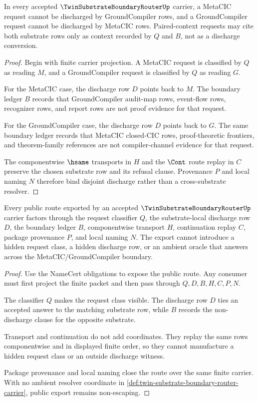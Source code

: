 \begin{theorem}
\label{thm:twin-substrate-boundary-router-metacic-groundcompiler-disjointness}
In every accepted $\TwinSubstrateBoundaryRouterUp$ carrier, a MetaCIC request cannot be discharged by GroundCompiler rows, and a GroundCompiler request cannot be discharged by MetaCIC rows. Paired-context requests may cite both substrate rows only as context recorded by $Q$ and $B$, not as a discharge conversion.
\end{theorem}
\begin{proof}
Begin with finite carrier projection. A MetaCIC request is classified by $Q$ as reading $M$, and a GroundCompiler request is classified by $Q$ as reading $G$.

For the MetaCIC case, the discharge row $D$ points back to $M$. The boundary ledger $B$ records that GroundCompiler audit-map rows, event-flow rows, recognizer rows, and report rows are not proof evidence for that request.

For the GroundCompiler case, the discharge row $D$ points back to $G$. The same boundary ledger records that MetaCIC closed-CIC rows, proof-theoretic frontiers, and theorem-family references are not compiler-channel evidence for that request.

The componentwise $\hsame$ transports in $H$ and the $\Cont$ route replay in $C$ preserve the chosen substrate row and its refusal clause. Provenance $P$ and local naming $N$ therefore bind disjoint discharge rather than a cross-substrate resolver.
\end{proof}

\begin{theorem}
\label{thm:twin-substrate-boundary-router-nonescape}
Every public route exported by an accepted $\TwinSubstrateBoundaryRouterUp$ carrier factors through the request classifier $Q$, the substrate-local discharge row $D$, the boundary ledger $B$, componentwise transport $H$, continuation replay $C$, package provenance $P$, and local naming $N$. The export cannot introduce a hidden request class, a hidden discharge row, or an ambient oracle that answers across the MetaCIC/GroundCompiler boundary.
\end{theorem}
\begin{proof}
Use the NameCert obligations to expose the public route. Any consumer must first project the finite packet and then pass through $Q,D,B,H,C,P,N$.

The classifier $Q$ makes the request class visible. The discharge row $D$ ties an accepted answer to the matching substrate row, while $B$ records the non-discharge clause for the opposite substrate.

Transport and continuation do not add coordinates. They replay the same rows componentwise and in displayed finite order, so they cannot manufacture a hidden request class or an outside discharge witness.

Package provenance and local naming close the route over the same finite carrier. With no ambient resolver coordinate in \autoref{def:twin-substrate-boundary-router-carrier}, public export remains non-escaping.
\end{proof}

